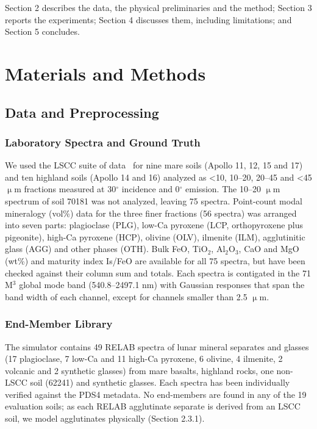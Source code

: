 \documentclass[remotesensing,article,submit,pdftex,moreauthors]{Definitions/mdpi}
\begin{document}
Section 2 describes the data, the physical preliminaries and the method; Section 3 reports the experiments; Section 4 discusses them, including limitations; and Section 5 concludes.

\section{Materials and Methods}

\subsection{Data and Preprocessing}

\subsubsection{Laboratory Spectra and Ground Truth}

We used the LSCC suite of data~\cite{taylor2001,taylor2010} for nine mare soils (Apollo 11, 12, 15 and 17) and ten highland soils (Apollo 14 and 16) analyzed as <10, 10--20, 20--45 and <45 $\upmu$m fractions measured at 30$^{\circ}$ incidence and 0$^{\circ}$ emission. The 10--20 $\upmu$m spectrum of soil 70181 was not analyzed, leaving 75 spectra. Point-count modal mineralogy (vol\%) data for the three finer fractions (56 spectra) was arranged into seven parts: plagioclase (PLG), low-Ca pyroxene (LCP, orthopyroxene plus pigeonite), high-Ca pyroxene (HCP), olivine (OLV), ilmenite (ILM), agglutinitic glass (AGG) and other phases (OTH). Bulk FeO, TiO$_{2}$, Al$_{2}$O$_{3}$, CaO and MgO (wt\%) and maturity index Is/FeO are available for all 75 spectra, but have been checked against their column sum and totals. Each spectra is contigated in the 71 M$^{3}$ global mode band (540.8--2497.1 nm) with Gaussian responses that span the band width of each channel, except for channels smaller than 2.5 $\upmu$m.

\subsubsection{End-Member Library}

The simulator contains 49 RELAB spectra of lunar mineral separates and glasses (17 plagioclase, 7 low-Ca and 11 high-Ca pyroxene, 6 olivine, 4 ilmenite, 2 volcanic and 2 synthetic glasses) from mare basalts, highland rocks, one non-LSCC soil (62241) and synthetic glasses. Each spectra has been individually verified against the PDS4 metadata. No end-members are found in any of the 19 evaluation soils; as each RELAB agglutinate separate is derived from an LSCC soil, we model agglutinates physically (Section 2.3.1).
\end{document}
